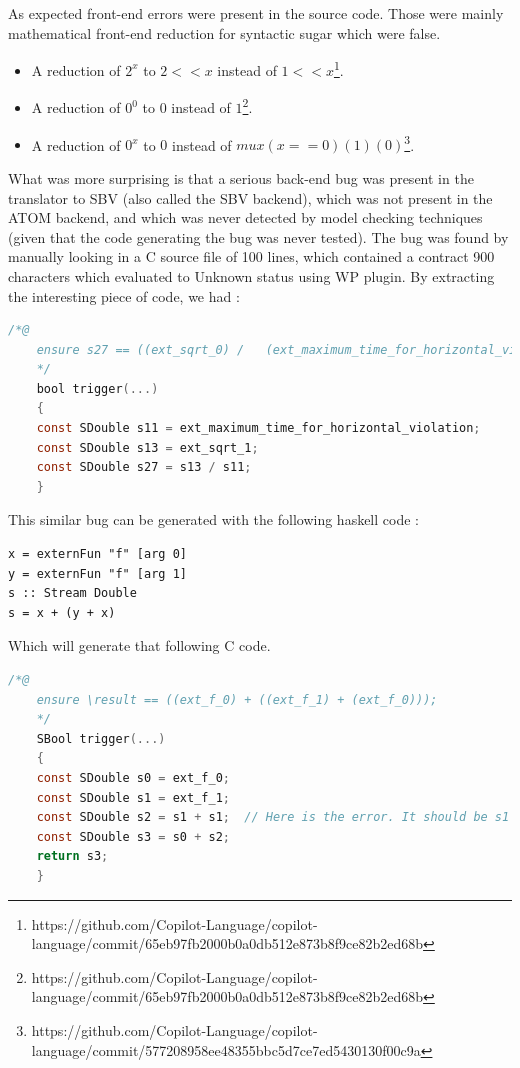 \documentclass[a4paper,11pt,final]{article}
\begin{document}
	As expected front-end errors were present in the source code. Those were mainly mathematical front-end reduction for syntactic sugar which were false.
	
	\begin{itemize}
		\item A reduction of $2^x$ to $2 << x$ instead of $1 << x$\footnote{https://github.com/Copilot-Language/copilot-language/commit/65eb97fb2000b0a0db512e873b8f9ce82b2ed68b}.
		\item A reduction of $0^0$ to $0$ instead of $1$\footnote{https://github.com/Copilot-Language/copilot-language/commit/65eb97fb2000b0a0db512e873b8f9ce82b2ed68b}.
		\item A reduction of $0^x$ to $0$ instead of $mux (x==0) (1) (0)$\footnote{https://github.com/Copilot-Language/copilot-language/commit/577208958ee48355bbc5d7ce7ed5430130f00c9a}.
	\end{itemize}
	
	What was more surprising is that a serious back-end bug was present in the translator to SBV (also called the SBV backend), which was not present in the ATOM backend, and which was never detected by model checking techniques (given that the code generating the bug was never tested). The bug was found by manually looking in a C source file of 100 lines, which contained a contract 900 characters which evaluated to Unknown status using WP plugin. By extracting the interesting piece of code, we had :
	\begin{lstlisting}[language=C, keywordstyle=\color{blue}]
	/*@
	ensure s27 == ((ext_sqrt_0) /   (ext_maximum_time_for_horizontal_violation));
	*/
	bool trigger(...)
	{
	const SDouble s11 = ext_maximum_time_for_horizontal_violation;
	const SDouble s13 = ext_sqrt_1;
	const SDouble s27 = s13 / s11;
	}  \end{lstlisting}
	This similar bug can be generated with the following haskell code :
\begin{verbatim}
x = externFun "f" [arg 0]
y = externFun "f" [arg 1]
s :: Stream Double
s = x + (y + x)
\end{verbatim}
	Which will generate that following C code.
	\begin{lstlisting}[language=C, keywordstyle=\color{blue}]
	/*@
	ensure \result == ((ext_f_0) + ((ext_f_1) + (ext_f_0)));
	*/
	SBool trigger(...)
	{
	const SDouble s0 = ext_f_0;
	const SDouble s1 = ext_f_1;
	const SDouble s2 = s1 + s1;  // Here is the error. It should be s1 + s0;
	const SDouble s3 = s0 + s2;
	return s3;
	}  \end{lstlisting}
	
\end{document}
